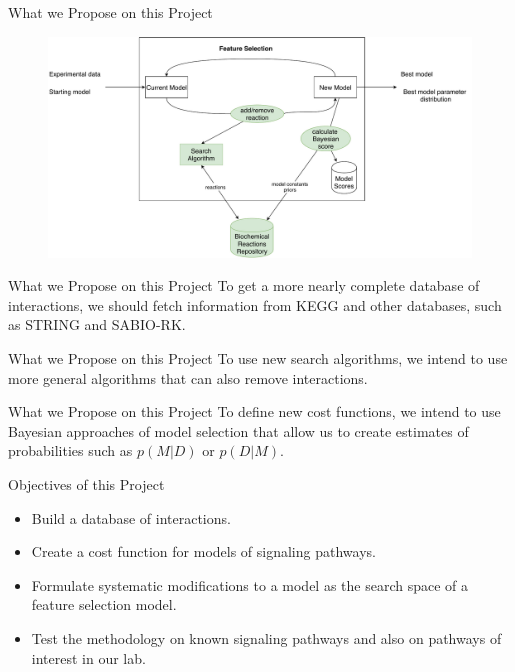 \documentclass{beamer}
\begin{document}
\begin{frame}{What we Propose on this Project}
\begin{flushleft}
\begin{figure}
    \includegraphics[scale=.35]{introduction/my_dissertation_diagram.pdf}
\end{figure}
\end{flushleft}
\end{frame}


\begin{frame}{What we Propose on this Project}
To get a more nearly complete database of interactions, we should fetch 
information from KEGG and other databases, \pause such as STRING and
SABIO-RK.
\end{frame}


\begin{frame}{What we Propose on this Project}
To use new search algorithms, \pause we intend to use more general
algorithms that can also remove interactions.
\end{frame}


\begin{frame}{What we Propose on this Project}
To define new cost functions, \pause we intend to use Bayesian 
approaches of model selection that allow us to create estimates of 
probabilities such as $p (M | D)$ or $p (D | M)$.
\end{frame}


\begin{frame}{Objectives of this Project}
\begin{itemize}
\pause
\item{Build a database of interactions.}
\pause
\item{Create a cost function for models of signaling pathways.}
\pause
\item{Formulate systematic modifications to a model as the search space
    of a feature selection model.}
\pause
\item{Test the methodology on known signaling pathways and also on 
    pathways of interest in our lab.}
\end{itemize}
\end{frame}
\end{document}
